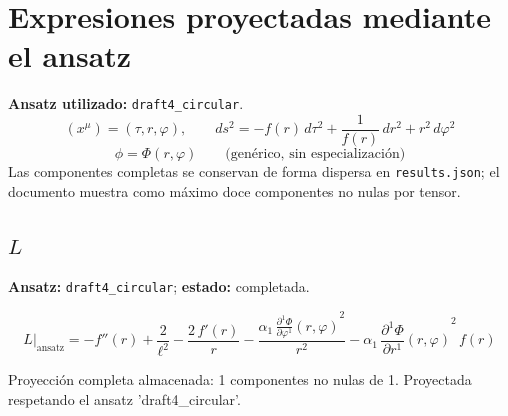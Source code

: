 \documentclass[11pt]{article}
\begin{document}
\section*{Expresiones proyectadas mediante el ansatz}
\textbf{Ansatz utilizado:} \texttt{draft4\_circular}.
\begin{dmath*}[breakdepth={3}]
(x^\mu)=\left(\tau, r, \varphi\right),\qquad ds^2 = -f\!\left(r\right)\,d\tau^2 + \frac{1}{f\!\left(r\right)}\,dr^2 + {r}^{2}\,d\varphi^2
\end{dmath*}
\begin{dmath*}[breakdepth={3}]
\phi = \Phi\!\left(r, \varphi\right)\qquad\text{(genérico, sin especialización)}
\end{dmath*}
Las componentes completas se conservan de forma dispersa en \texttt{results.json}; el documento muestra como máximo doce componentes no nulas por tensor.
\subsection*{$ L $}
\textbf{Ansatz:} \texttt{draft4\_circular}; \textbf{estado:} completada.\par
\begin{dmath*}[breakdepth={5}]
L\big|_{\mathrm{ansatz}} = -f''\!\left(r\right) + \frac{2}{{\ell}^{2}} - \frac{2\,f'\!\left(r\right)}{r} - \frac{\alpha_{1}\,{\frac{\partial^{1} \Phi}{\partial \varphi^{1}}\!\left(r, \varphi\right)}^{2}}{{r}^{2}} - \alpha_{1}\,{\frac{\partial^{1} \Phi}{\partial r^{1}}\!\left(r, \varphi\right)}^{2}\,f\!\left(r\right)
\end{dmath*}
\par\smallskip
Proyección completa almacenada: 1 componentes no nulas de 1. Proyectada respetando el ansatz 'draft4\_circular'.\par\medskip
{}
\end{document}
